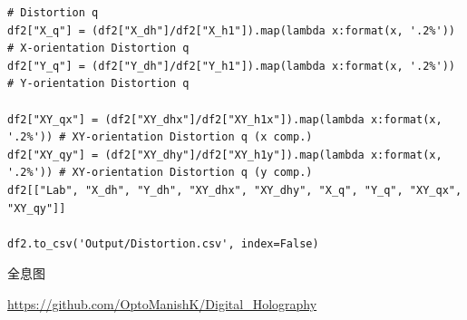 \documentclass[10pt,a4paper,twoside,UTF8]{ctexart}
\begin{document}
\begin{lstlisting}
# Distortion q
df2["X_q"] = (df2["X_dh"]/df2["X_h1"]).map(lambda x:format(x, '.2%')) # X-orientation Distortion q
df2["Y_q"] = (df2["Y_dh"]/df2["Y_h1"]).map(lambda x:format(x, '.2%')) # Y-orientation Distortion q

df2["XY_qx"] = (df2["XY_dhx"]/df2["XY_h1x"]).map(lambda x:format(x, '.2%')) # XY-orientation Distortion q (x comp.)
df2["XY_qy"] = (df2["XY_dhy"]/df2["XY_h1y"]).map(lambda x:format(x, '.2%')) # XY-orientation Distortion q (y comp.)
df2[["Lab", "X_dh", "Y_dh", "XY_dhx", "XY_dhy", "X_q", "Y_q", "XY_qx", "XY_qy"]]

df2.to_csv('Output/Distortion.csv', index=False)
\end{lstlisting}

全息图

\url{https://github.com/OptoManishK/Digital_Holography}
\end{document}
